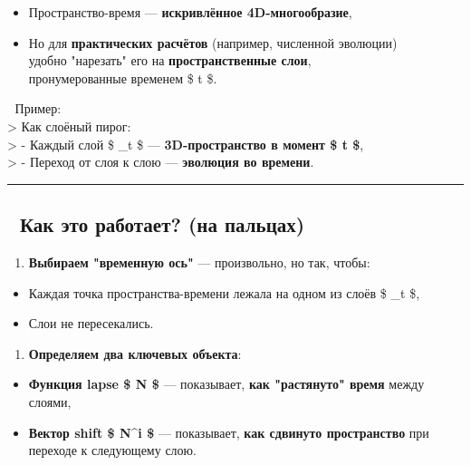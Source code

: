 \documentclass[11pt]{article}
\providecommand{\tightlist}{%
      \setlength{\itemsep}{0pt}\setlength{\parskip}{0pt}}
\begin{document}
\begin{itemize}
\tightlist
\item
  Пространство-время --- \textbf{искривлённое 4D-многообразие},
\item
  Но для \textbf{практических расчётов} (например, численной эволюции)\\
  удобно "нарезать" его на \textbf{пространственные слои},\\
  пронумерованные временем \$ t \$.
\end{itemize}

📌 Пример:\\
\textgreater{} Как слоёный пирог:\\
\textgreater{} - Каждый слой \$ \Sigma\_t \$ --- \textbf{3D-пространство
в момент \$ t \$},\\
\textgreater{} - Переход от слоя к слою --- \textbf{эволюция во
времени}.

\begin{center}\rule{0.5\linewidth}{\linethickness}\end{center}

\subsection{🔹 Как это работает? (на
пальцах)}\label{ux43aux430ux43a-ux44dux442ux43e-ux440ux430ux431ux43eux442ux430ux435ux442-ux43dux430-ux43fux430ux43bux44cux446ux430ux445}

\begin{enumerate}
\def\labelenumi{\arabic{enumi}.}
\tightlist
\item
  \textbf{Выбираем "временную ось"} --- произвольно, но так, чтобы:
\end{enumerate}

\begin{itemize}
\tightlist
\item
  Каждая точка пространства-времени лежала на одном из слоёв \$
  \Sigma\_t \$,
\item
  Слои не пересекались.
\end{itemize}

\begin{enumerate}
\def\labelenumi{\arabic{enumi}.}
\setcounter{enumi}{1}
\tightlist
\item
  \textbf{Определяем два ключевых объекта}:
\end{enumerate}

\begin{itemize}
\tightlist
\item
  \textbf{Функция lapse \$ N \$} --- показывает, \textbf{как "растянуто"
  время} между слоями,
\item
  \textbf{Вектор shift \$ N\^{}i \$} --- показывает, \textbf{как
  сдвинуто пространство} при переходе к следующему слою.
\end{itemize}
\end{document}
